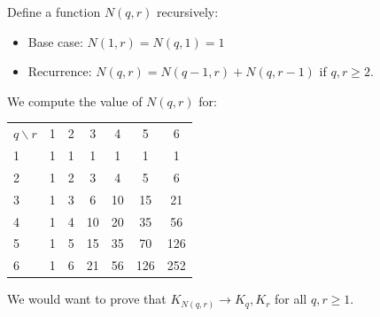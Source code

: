 \documentclass[12pt]{article}
\begin{document}
Define a function $N(q,r)$ recursively: 
\begin{itemize}
    \item Base case: $N(1,r)=N(q,1)=1$
    \item Recurrence: $N(q,r)=N(q-1,r)+N(q,r-1)$ if $q,r\geq 2$.
\end{itemize}
\hypertarget{tableforN}{}
We compute the value of $N(q,r)$ for:
\begin{table}[H]
    \centering
    \begin{tabular}{lcccccc}
    $q\backslash r$ & 1 & 2 & 3  & 4  & 5   & 6   \\
    1                  & 1 & 1 & 1  & 1  & 1   & 1   \\
    2                  & 1 & 2 & 3  & 4  & 5   & 6   \\
    3                  & 1 & 3 & 6  & 10 & 15  & 21  \\
    4                  & 1 & 4 & 10 & 20 & 35  & 56  \\
    5                  & 1 & 5 & 15 & 35 & 70  & 126 \\
    6                  & 1 & 6 & 21 & 56 & 126 & 252
    \end{tabular}
\end{table}
We would want to prove that $K_{N(q,r)}\to K_q,K_r$ for all $q,r\geq 1$.
\end{document}
